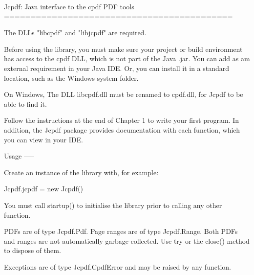 Jcpdf: Java interface to the cpdf PDF tools
===========================================

The DLLs "libcpdf" and "libjcpdf" are required.

Before using the library, you must make sure your project or build environment
has access to the cpdf DLL, which is not part of the Java .jar. You can add as
am external requirement in your Java IDE. Or, you can install it in a standard
location, such as the Windows system folder.

On Windows, The DLL libcpdf.dll must be renamed to cpdf.dll, for Jcpdf to be
able to find it.

Follow the instructions at the end of Chapter 1 to write your first program. In
addition, the Jcpdf package provides documentation with each function, which
you can view in your IDE.

Usage
-----

Create an instance of the library with, for example:

Jcpdf.jcpdf = new Jcpdf()

You must call startup() to initialise the library prior to calling any other
function.

PDFs are of type Jcpdf.Pdf. Page ranges are of type Jcpdf.Range. Both PDFs and
ranges are not automatically garbage-collected. Use try or the close() method
to dispose of them.

Exceptions are of type Jcpdf.CpdfError and may be raised by any function.

